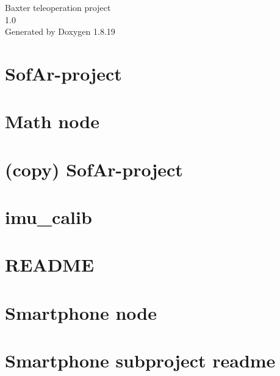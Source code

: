 \let\mypdfximage\pdfximage\def\pdfximage{\immediate\mypdfximage}\documentclass[twoside]{book}
\newcommand{\+}{\discretionary{\mbox{\scriptsize$\hookleftarrow$}}{}{}}
\newcommand{\clearemptydoublepage}{%
  \newpage{\pagestyle{empty}\cleardoublepage}%
}
\begin{document}
\hypersetup{pageanchor=false,
             bookmarksnumbered=true,
             pdfencoding=unicode
            }
\begin{titlepage}
\vspace*{7cm}
\begin{center}%
{\Large Baxter teleoperation project \\[1ex]\large 1.\+0 }\\
\vspace*{1cm}
{\large Generated by Doxygen 1.8.19}\\
\end{center}
\end{titlepage}
\clearemptydoublepage
{}
\tableofcontents
\clearemptydoublepage
{}
\hypersetup{pageanchor=true}

\chapter{Sof\+Ar-\/project}
\label{index}\hypertarget{index}{}
\chapter{Math node}
\label{md_Math_README}

\chapter{(copy) Sof\+Ar-\/project}
\label{md_README_}

\chapter{imu\+\_\+calib}
\label{md_Smartphone_imu_calib_README}

\chapter{R\+E\+A\+D\+ME}
\label{md_Smartphone_README}

\chapter{Smartphone node}
\label{md_Smartphone_smartphone_readme}

\chapter{Smartphone subproject readme}
\label{md_Smartphone_smartphone_scripts_readme}

\end{document}
